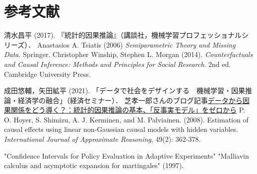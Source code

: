\documentclass[uplatex,dvipdfmx]{jsreport}
\begin{document}
\chapter{参考文献}

\begin{thebibliography}{99}
    清水昌平 (2017). 『統計的因果推論』（講談社，機械学習プロフェッショナルシリーズ）．
    Anastasios A. Tsiatis (2006) \textit{Semiparametric Theory and Missing Data}. Springer.
    Christopher Winship, Stephen L. Morgan (2014). \textit{Counterfactuals and Causal Inference: Methods and Principles for Social Research}. 2nd ed. Cambridge University Press.

    成田悠輔，矢田絋平 (2021). 「データで社会をデザインする　機械学習・因果推論・経済学の融合」（経済セミナー）．
    芝孝一郎さんのブログ記事\href{https://www.krsk-phs.com/entry/counterfactual_assumptions}{データから因果関係をどう導く？：統計的因果推論の基本、「反事実モデル」をゼロから}
    P. O. Hoyer, S. Shimizu, A. J. Kerminen, and M. Palviainen. (2008). Estimation of causal effects using linear non-Gaussian causal models with hidden variables. \textit{International Journal of Approximate Reasoning}, 49(2): 362-378.


    "Confidence Intervals for Policy Evaluation in Adaptive Experiments"
    "Malliavin calculus and asymptotic expansion for martingales" (1997).
\end{thebibliography}
\end{document}
